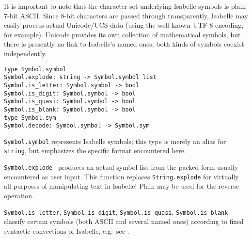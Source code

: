 \begin{isabellebody}
\begin{isamarkuptext}
\medskip It is important to note that the character set underlying
Isabelle symbols is plain 7-bit ASCII.  Since 8-bit characters are
passed through transparently, Isabelle may easily process actual
Unicode/UCS data (using the well-known UTF-8 encoding, for example).
Unicode provides its own collection of mathematical symbols, but there
is presently no link to Isabelle's named ones; both kinds of symbols
coexist independently.%
\end{isamarkuptext}%
\isamarkuptrue%
%
\isadelimmlref
%
\endisadelimmlref
%
\isatagmlref
%
\begin{isamarkuptext}%
\begin{mldecls}
  \verb|type Symbol.symbol| \\
  \verb|Symbol.explode: string -> Symbol.symbol list| \\
  \verb|Symbol.is_letter: Symbol.symbol -> bool| \\
  \verb|Symbol.is_digit: Symbol.symbol -> bool| \\
  \verb|Symbol.is_quasi: Symbol.symbol -> bool| \\
  \verb|Symbol.is_blank: Symbol.symbol -> bool| \\
  \verb|type Symbol.sym| \\
  \verb|Symbol.decode: Symbol.symbol -> Symbol.sym| \\
  \end{mldecls}

  \begin{description}

  \item \verb|Symbol.symbol| represents Isabelle symbols; this type
  is merely an alias for \verb|string|, but emphasizes the
  specific format encountered here.

  \item \verb|Symbol.explode|~ produces an actual symbol
  list from the packed form usually encountered as user input.  This
  function replaces \verb|String.explode| for virtually all purposes
  of manipulating text in Isabelle!  Plain  may be
  used for the reverse operation.

  \item \verb|Symbol.is_letter|, \verb|Symbol.is_digit|, \verb|Symbol.is_quasi|, \verb|Symbol.is_blank| classify certain symbols
  (both ASCII and several named ones) according to fixed syntactic
  convections of Isabelle, e.g.\ see \cite{isabelle-isar-ref}.


\end{description}
\end{isamarkuptext}
\end{isabellebody}
